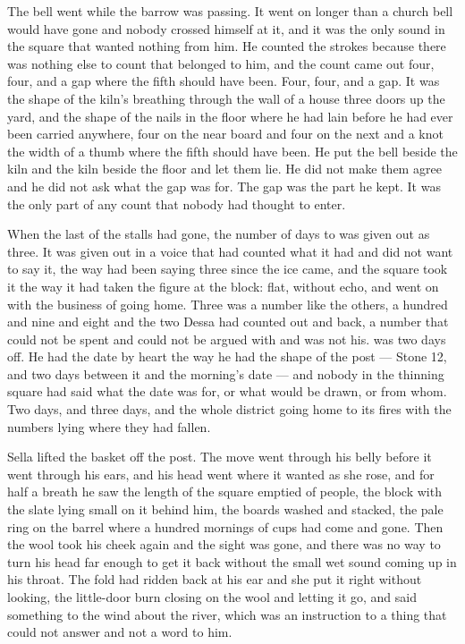 The bell went while the barrow was passing. It went on longer than a church bell would have gone and nobody crossed himself at it, and it was the only sound in the square that wanted nothing from him. He counted the strokes because there was nothing else to count that belonged to him, and the count came out four, four, and a gap where the fifth should have been. Four, four, and a gap. It was the shape of the kiln's breathing through the wall of a house three doors up the yard, and the shape of the nails in the floor where he had lain before he had ever been carried anywhere, four on the near board and four on the next and a knot the width of a thumb where the fifth should have been. He put the bell beside the kiln and the kiln beside the floor and let them lie. He did not make them agree and he did not ask what the gap was for. The gap was the part he kept. It was the only part of any count that nobody had thought to enter.

When the last of the stalls had gone, the number of days to  was given out as three. It was given out in a voice that had counted what it had and did not want to say it, the way  had been saying three since the ice came, and the square took it the way it had taken the figure at the block: flat, without echo, and went on with the business of going home. Three was a number like the others, a hundred and nine and eight and the two Dessa had counted out and back, a number that could not be spent and could not be argued with and was not his.  was two days off. He had the date by heart the way he had the shape of the post --- Stone 12, and two days between it and the morning's date --- and nobody in the thinning square had said what the date was for, or what would be drawn, or from whom. Two days, and three days, and the whole district going home to its fires with the numbers lying where they had fallen.

Sella lifted the basket off the post. The move went through his belly before it went through his ears, and his head went where it wanted as she rose, and for half a breath he saw the length of the square emptied of people, the block with the slate lying small on it behind him, the boards washed and stacked, the pale ring on the barrel where a hundred mornings of cups had come and gone. Then the wool took his cheek again and the sight was gone, and there was no way to turn his head far enough to get it back without the small wet sound coming up in his throat. The fold had ridden back at his ear and she put it right without looking, the little-door burn closing on the wool and letting it go, and said something to the wind about the river, which was an instruction to a thing that could not answer and not a word to him.

